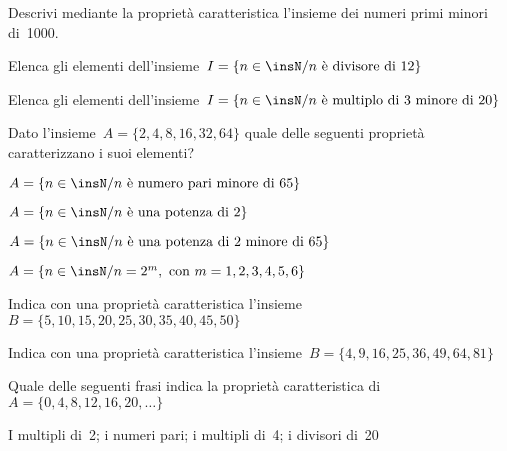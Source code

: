 \begin{esercizio}
\label{ese:6.8}
Descrivi mediante la proprietà caratteristica l'insieme dei numeri primi minori 
di~1000.
\end{esercizio}

\begin{esercizio}
\label{ese:6.9}
Elenca gli elementi dell'insieme~$I=\{n\in\insN/n\text{ è divisore di }12\}$
\end{esercizio}

\begin{esercizio}
\label{ese:6.10}
Elenca gli elementi dell'insieme~$I=\{n\in\insN/n\text{ è multiplo di~3 minore 
di }20\}$
\end{esercizio}


\begin{esercizio}
\label{ese:6.11}
Dato l'insieme~$A=\{2, 4, 8, 16, 32, 64\}$ quale delle seguenti proprietà 
caratterizzano i suoi elementi?
\begin{enumeratea}
\item $A=\{n\in\insN/n \text{ è numero pari minore di }65\}$
\item $A=\{n\in\insN/n\text{ è una potenza di }2\}$
\item $A=\{n\in\insN/n\text{ è una potenza di~2 minore di }65\}$
\item $A=\{n\in\insN/n=2^{m},\text{ con }m=1,2,3,4,5,6\}$
\end{enumeratea}
\end{esercizio}

\begin{esercizio}
\label{ese:6.12}
Indica con una proprietà caratteristica l'insieme~$B=\{5, 10, 15, 20, 25, 30, 
35, 40, 45, 50\}$
\end{esercizio}

\begin{esercizio}
\label{ese:6.13}
Indica con una proprietà caratteristica
l'insieme~$B=\{4, 9, 16, 25, 36, 49, 64, 81\}$
\end{esercizio}

\begin{esercizio}
\label{ese:6.14}
Quale delle seguenti frasi indica la proprietà caratteristica
di~$A=\{0, 4, 8, 12, 16, 20, \ldots\}$
\begin{center}
\boxA\quad I multipli di~2; \quad\boxB\quad i numeri pari; \quad\boxC\quad i 
multipli di~4; \quad\boxD\quad i divisori di~20
\end{center}
\end{esercizio}

